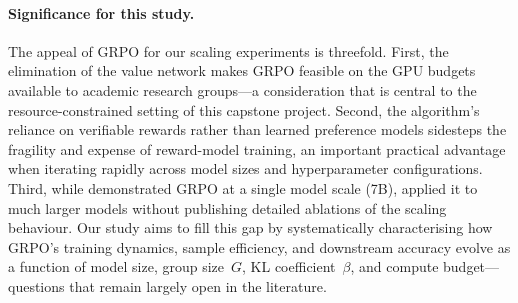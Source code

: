 \paragraph{Significance for this study.}
The appeal of GRPO for our scaling experiments is threefold.  First, the
elimination of the value network makes GRPO feasible on the GPU budgets
available to academic research groups---a consideration that is central to
the resource-constrained setting of this capstone project.  Second, the
algorithm's reliance on verifiable rewards rather than learned preference
models sidesteps the fragility and expense of reward-model training, an
important practical advantage when iterating rapidly across model sizes and
hyperparameter configurations.  Third, while
\cite{shao2024deepseekmath} demonstrated GRPO at a single model scale
(7B), \cite{deepseek2025r1} applied it to much larger models without
publishing detailed ablations of the scaling behaviour.  Our study aims to
fill this gap by systematically characterising how GRPO's training
dynamics, sample efficiency, and downstream accuracy evolve as a function
of model size, group size~$G$, KL coefficient~$\beta$, and
compute budget---questions that remain largely open in the literature.
